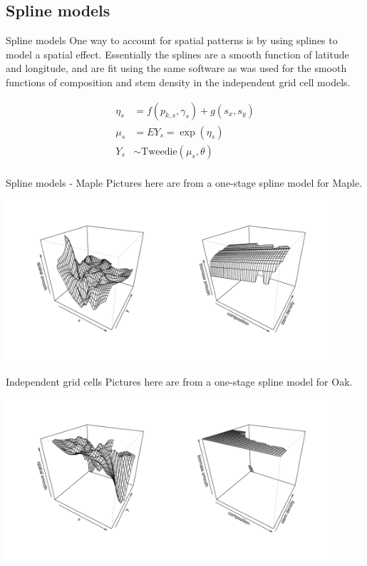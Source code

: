 \documentclass{beamer}
\begin{document}
\subsection{Spline models}
\begin{frame}{Spline models}
  One way to account for spatial patterns is by using splines to model a spatial effect. Essentially the splines are a smooth function of latitude and longitude, and are fit using the same software as was used for the smooth functions of composition and stem density in the independent grid cell models.
  
  \begin{align*}
      \eta_s &= f(p_{k,s}, \gamma_s) + g(s_x, s_y)\\
      \mu_s &= EY_s = \exp{(\eta_s)}\\
      Y_s &\sim \text{Tweedie}(\mu_s, \theta)\\
  \end{align*}
\end{frame}

\begin{frame}{Spline models - Maple}
 Pictures here are from a one-stage spline model for Maple.\\
  \begin{center}
    \includegraphics[width=0.9\textwidth]{../../figures/spline-tweedie/Maple-residuals-heatmap.pdf}
  \end{center}
\end{frame}

\begin{frame}{Independent grid cells}
 Pictures here are from a one-stage spline model for Oak.\\
  \begin{center}
    \includegraphics[width=0.9\textwidth]{../../figures/spline-tweedie/Oaks-residuals-heatmap.pdf}
  \end{center}
\end{frame}
\end{document}
